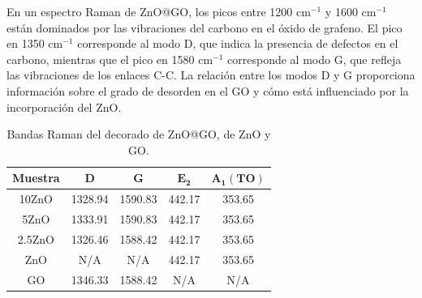\documentclass[12pt]{article}
\begin{document}
En un espectro Raman de ZnO@GO, los picos entre 1200 cm$^{-1}$ y 1600 cm$^{-1}$ están dominados por las vibraciones del carbono en el óxido de grafeno. El pico en 1350 cm$^{-1}$ corresponde al modo D, que indica la presencia de defectos en el carbono, mientras que el pico en 1580 cm$^{-1}$ corresponde al modo G, que refleja las vibraciones de los enlaces C-C. La relación entre los modos D y G proporciona información sobre el grado de desorden en el GO y cómo está influenciado por la incorporación del ZnO.\vspace{1em} %

\begin{table}[h!]
\centering
\caption{Bandas Raman del decorado de ZnO@GO, de ZnO y GO.}
\begin{tabular}{|c|c|c|c|c|}
\hline
\textbf{Muestra} & \(\mathbf{D}\)       & \(\mathbf{G}\)       & \(\mathbf{E_{2}}\)   & \(\mathbf{A_{1}(TO)}\) \\ \hline
10ZnO            & 1328.94             & 1590.83             & 442.17              & 353.65                \\ \hline
5ZnO             & 1333.91             & 1590.83             & 442.17              & 353.65                \\ \hline
2.5ZnO           & 1326.46             & 1588.42             & 442.17              & 353.65                \\ \hline
ZnO              & N/A                 & N/A                 & 442.17              & 353.65                \\ \hline
GO               & 1346.33             & 1588.42             & N/A                 & N/A                   \\ \hline
\end{tabular}
\label{tab:modos_vibracionales_ZnO_GO}
\end{table}
\end{document}
